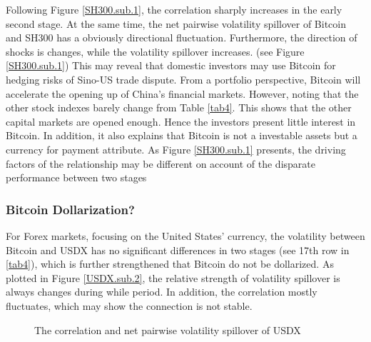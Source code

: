 \documentclass[review]{elsarticle}
\begin{document}
Following Figure \ref{SH300.sub.1}, the correlation sharply increases in the early second stage. At the same time, the net pairwise volatility spillover of Bitcoin and SH300 has a obviously directional fluctuation. Furthermore, the direction of shocks is changes, while the volatility spillover increases. (see Figure \ref{SH300.sub.1}) This may reveal that domestic investors may use Bitcoin for hedging risks of Sino-US trade dispute. From a portfolio perspective, Bitcoin will accelerate the opening up of China's financial markets. However, noting that the other stock indexes barely change from Table \ref{tab4}. This shows that the other capital markets are opened enough. Hence the investors present little interest in Bitcoin. In addition, it also explains that Bitcoin is not a investable assets but a currency for payment attribute. As Figure \ref{SH300.sub.1} presents, the driving factors of the relationship may be different on account of the disparate performance between two stages



\subsubsection{Bitcoin Dollarization?}
For Forex markets, focusing on the United States' currency, the volatility between Bitcoin and USDX has no significant differences in two stages (see 17th row in \ref{tab4}), which is further strengthened that Bitcoin do not be dollarized. As plotted in Figure \ref{USDX.sub.2}, the relative strength of volatility spillover is always changes during while period. In addition, the correlation mostly fluctuates, which may show the connection is not stable. 

\begin{figure}[H]
	\centering  %
	

	\caption{The correlation and net pairwise volatility spillover of USDX}
	\label{USDX.main}
\end{figure}
\end{document}
